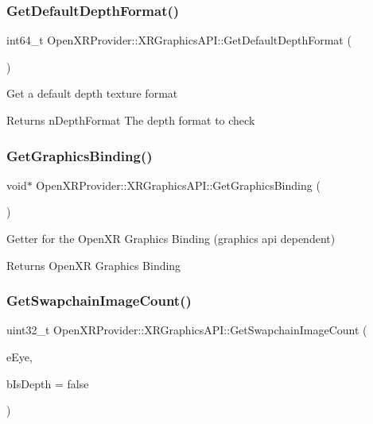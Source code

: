 \subsubsection{\texorpdfstring{GetDefaultDepthFormat()}{GetDefaultDepthFormat()}}
{\footnotesize\ttfamily int64\+\_\+t Open\+X\+R\+Provider\+::\+X\+R\+Graphics\+A\+P\+I\+::\+Get\+Default\+Depth\+Format (\begin{DoxyParamCaption}{ }\end{DoxyParamCaption})}

Get a default depth texture format \begin{DoxyReturn}{Returns}
n\+Depth\+Format The depth format to check 
\end{DoxyReturn}
\mbox{\label{class_open_x_r_provider_1_1_x_r_graphics_a_p_i_a2c474282e17bf45b87bae7e0c95efa57}} 
\subsubsection{\texorpdfstring{GetGraphicsBinding()}{GetGraphicsBinding()}}
{\footnotesize\ttfamily void$\ast$ Open\+X\+R\+Provider\+::\+X\+R\+Graphics\+A\+P\+I\+::\+Get\+Graphics\+Binding (\begin{DoxyParamCaption}{ }\end{DoxyParamCaption})\hspace{0.3cm}{\ttfamily [inline]}}

Getter for the Open\+XR Graphics Binding (graphics api dependent) \begin{DoxyReturn}{Returns}
Open\+XR Graphics Binding 
\end{DoxyReturn}
\mbox{\label{class_open_x_r_provider_1_1_x_r_graphics_a_p_i_a41503928a4dfb8832ee9485228fe8372}} 
\subsubsection{\texorpdfstring{GetSwapchainImageCount()}{GetSwapchainImageCount()}}
{\footnotesize\ttfamily uint32\+\_\+t Open\+X\+R\+Provider\+::\+X\+R\+Graphics\+A\+P\+I\+::\+Get\+Swapchain\+Image\+Count (\begin{DoxyParamCaption}\item[{const \mbox{\hyperlink{namespace_open_x_r_provider_a8aa379869e30772896e6c468eb54f155}{E\+X\+R\+Eye}}}]{e\+Eye,  }\item[{const bool}]{b\+Is\+Depth = {\ttfamily false} }\end{DoxyParamCaption})}

